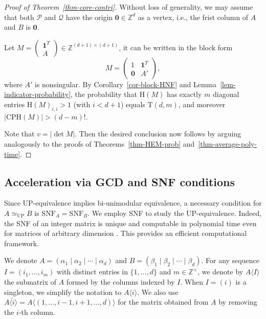 \documentclass[reqno, 12pt]{article}
\theoremstyle{mydefinition}
\theoremstyle{myremark}
\numberwithin{algorithm}{section}
\newcommand{\h}{{\mathrm{H}}}
\begin{document}
\begin{proof}[Proof of Theorem~\ref{thm-core-contri}]
    Without loss of generality, we may assume that both $\mathcal{P}$ and $\mathcal{Q}$ have the origin $\mathbf{0} \in \mathbb{Z}^d$ as a vertex, i.e., the frist column of $A$ and $B$ is $\mathbf{0}$.

    Let $M = \begin{pmatrix} \mathbf{1}^T\\ A  \end{pmatrix}  \in \mathbb{Z}^{(d+1) \times (d+1)}$, it can be written in the block form
    \[
    M = \begin{pmatrix}
        1 & \mathbf{1}^T\\
         \mathbf{0}  & A'
    \end{pmatrix},
    \]
    where $A'$ is nonsingular. By Corollary~\ref{cor-block-HNF} and Lemma~\ref{lem-indicator-probability}, the probability that  $\h(M)$ has exactly $m$ diagonal entries $\mathrm{H}(M)_{i,i}>1$ (with $i<d+1$) equals $\mathrm{T}(d,m)$, and moreover $\lvert \mathrm{CPH}(M) \rvert > (d-m)!$.

    Note that $v=|\det M|$. Then the desired conclusion now follows by arguing analogously to the proofs of Theorems~\ref{thm-HEM-prob} and~\ref{thm-average-poly-time}.
\end{proof}



\subsection{Acceleration via GCD and SNF conditions}

Since UP-equivalence implies bi-unimodular equivalence, a necessary condition for $A\simeq_{\mathrm{UP}} B$ is $\mathrm{SNF}_A=\mathrm{SNF}_B$. We employ SNF to study the UP-equivalence. Indeed, the SNF of an integer matrix is unique and computable in polynomial time even for matrices of arbitrary dimension  \cite{SNF_polynomial}. This provides an efficient computational framework.

We denote $A = (\alpha_1 \mid \alpha_2 \mid \cdots \mid \alpha_d)$ and $B = (\beta_1 \mid \beta_2 \mid \cdots \mid \beta_d)$.
For any sequence $I = (i_1, \dots, i_m)$ with distinct entries in $ \{1,\dots,d\}$ and $m \in \mathbb{Z}^+$, we denote by $A\langle I \rangle$ the submatrix of $A$ formed by the columns indexed by $I$.
When $I = (i)$ is a singleton, we simplify the notation to $A\langle i \rangle$. We also use $A\langle \hat i \rangle  = A\langle (1,\dots,i-1,i+1,\dots,d) \rangle $ for the matrix obtained from $A$ by removing the $i$-th column.
\end{document}
